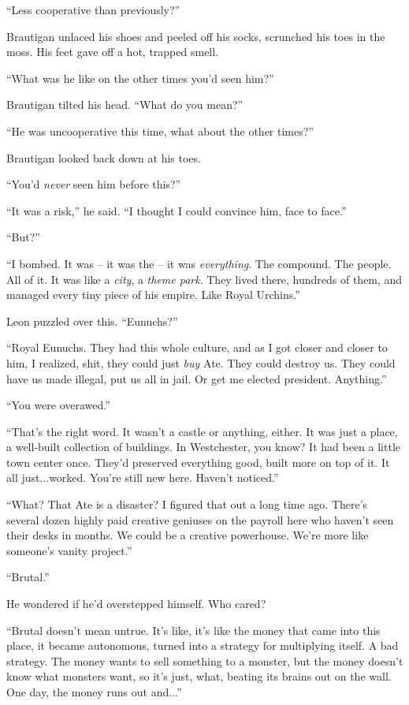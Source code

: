 “Less cooperative than previously?”

Brautigan unlaced his shoes and peeled off his socks, scrunched his 
toes in the moss. His feet gave off a hot, trapped smell.

“What was he like on the other times you'd seen him?”

Brautigan tilted his head. “What do you mean?”

“He was uncooperative this time, what about the other times?”

Brautigan looked back down at his toes.

“You'd \emph{never} seen him before this?”

“It was a risk,” he said. “I thought I could convince him, face 
to face.”

“But?”

“I bombed. It was -- it was the -- it was \emph{everything}. The 
compound. The people. All of it. It was like a \emph{city}, a 
\emph{theme park}. They lived there, hundreds of them, and managed 
every tiny piece of his empire. Like Royal Urchins.”

Leon puzzled over this. “Eunuchs?”

“Royal Eunuchs. They had this whole culture, and as I got closer and 
closer to him, I realized, shit, they could just \emph{buy} Ate. They 
could destroy us. They could have us made illegal, put us all in jail. 
Or get me elected president. Anything.”

“You were overawed.”

“That's the right word. It wasn't a castle or anything, either. It 
was just a place, a well-built collection of buildings. In Westchester, 
you know? It had been a little town center once. They'd preserved 
everything good, built more on top of it. It all just...worked. You're 
still new here. Haven't noticed.”

“What? That Ate is a disaster? I figured that out a long time ago. 
There's several dozen highly paid creative geniuses on the payroll here 
who haven't seen their desks in months. We could be a creative 
powerhouse. We're more like someone's vanity project.”

“Brutal.”

He wondered if he'd overstepped himself. Who cared?

“Brutal doesn't mean untrue. It's like, it's like the money that came 
into this place, it became autonomous, turned into a strategy for 
multiplying itself. A bad strategy. The money wants to sell something 
to a monster, but the money doesn't know what monsters want, so it's 
just, what, beating its brains out on the wall. One day, the money runs 
out and...”

